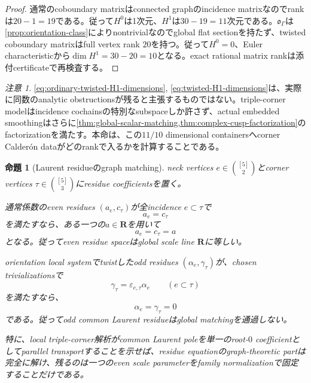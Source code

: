 \documentclass[11pt,a4paper]{ltjsarticle}
\newtheorem{proposition}[theorem]{命題}
\theoremstyle{definition}
\theoremstyle{remark}
\newtheorem{remark}[theorem]{注意}
\newcommand{\RR}{\mathbf R}
\begin{document}
\begin{proof}
通常のcoboundary matrixはconnected graphのincidence matrixなのでrankは$20-1=19$である。従って$H^0$は1次元、$H^1$は$30-19=11$次元である。$\mathfrak o_\Gamma$は\cref{prop:orientation-class}によりnontrivialなのでglobal flat sectionを持たず、twisted coboundary matrixはfull vertex rank $20$を持つ。従って$H^0=0$、Euler characteristicから$\dim H^1=30-20=10$となる。exact rational matrix rankは添付certificateで再検査する。
\end{proof}

\begin{remark}
\eqref{eq:ordinary-twisted-H1-dimensions}, \eqref{eq:twisted-H1-dimensions}は、実際に同数のanalytic obstructionsが残ると主張するものではない。triple-corner modelはincidence cochainsの特別なsubspaceしか許さず、actual embedded smoothingはさらに\cref{thm:global-scalar-matching,thm:complex-cusp-factorization}のfactorizationを満たす。本命は、この$11/10$ dimensional containersへcorner Calderón dataがどのrankで入るかを計算することである。
\end{remark}

\begin{proposition}[Laurent residueのgraph matching]
\label{prop:residue-graph-matching}
neck vertices $e\in\binom{[5]}2$とcorner vertices
$\tau\in\binom{[5]}3$にresidue coefficientsを置く。

通常係数のeven residues $(a_e,c_\tau)$が全incidence $e\subset\tau$で
\begin{equation}\label{eq:even-residue-matching}
 a_e=c_\tau
\end{equation}
を満たすなら、ある一つの$a\in\RR$を用いて
\begin{equation}\label{eq:even-residue-global-line}
 a_e=c_\tau=a
\end{equation}
となる。従ってeven residue spaceはglobal scale line $\RR$に等しい。

orientation local systemでtwistしたodd residues $(\alpha_e,\gamma_\tau)$が、chosen trivializationsで
\begin{equation}\label{eq:odd-residue-matching}
 \gamma_\tau=\varepsilon_{e,\tau}\alpha_e
 \qquad(e\subset\tau)
\end{equation}
を満たすなら、
\begin{equation}\label{eq:odd-residue-vanishing}
 \alpha_e=\gamma_\tau=0
\end{equation}
である。従ってodd common Laurent residueはglobal matchingを通過しない。

特に、local triple-corner解析がcommon Laurent poleを単一のroot-$0$ coefficientとしてparallel transportすることを示せば、residue equationのgraph-theoretic partは完全に解け、残るのは一つのeven scale parameterをfamily normalizationで固定することだけである。
\end{proposition}
\end{document}
